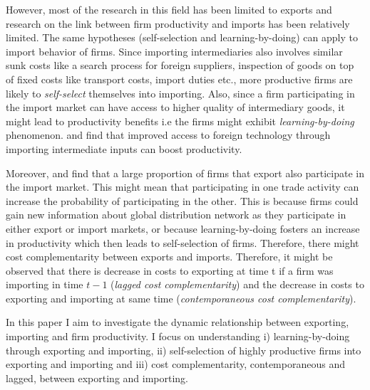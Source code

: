 \documentclass[12pt]{article}
\begin{document}



However, most of the research in this field has been limited to
exports and research on the link between firm productivity and imports has been relatively limited. The same hypotheses (self-selection and learning-by-doing) can  apply
to import behavior of firms. Since importing intermediaries also
involves  
similar sunk costs like  a search process for foreign suppliers,
inspection of goods on top of fixed costs like  transport costs, import duties
etc., more productive firms are likely to \textit{self-select} themselves
into importing. Also, since a firm
participating in the import market can have access to higher quality
of intermediary goods, it might lead to productivity benefits
i.e the firms might exhibit \textit{learning-by-doing} phenomenon. 
\textcite{topalova2011trade}  and \textcite{halpern2011imported}
find that improved access to foreign technology through importing
intermediate inputs can boost productivity. 

Moreover, \textcite{muuls2009imports} and \textcite{aristei2013firms} find that
a large proportion of firms that export also participate in the import
market. This might mean that participating in one trade activity can increase the probability of
participating in the other. This is
because  firms could gain new information about global distribution
network as they participate in either export or import markets, or
because learning-by-doing fosters an increase in productivity which
then leads to self-selection of firms. Therefore, there might cost
complementarity between exports and imports. Therefore, it might be
observed that there is decrease in costs to
exporting at time t if a firm was importing in time $t-1$
(\textit{lagged cost complementarity}) and the decrease in costs 
to exporting and importing at same time 
(\textit{contemporaneous cost complementarity}).  

In this paper I aim to investigate the dynamic relationship between
exporting, importing and firm productivity. I focus on understanding 
i) learning-by-doing through exporting and importing, ii)
self-selection of highly productive firms into exporting and importing
and iii) cost
complementarity, contemporaneous and lagged, between exporting and
importing. 
\end{document}
